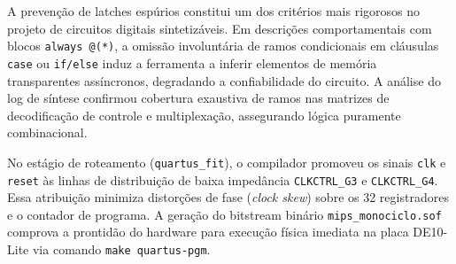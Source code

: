 A prevenção de latches espúrios constitui um dos critérios mais rigorosos no projeto de circuitos digitais sintetizáveis. Em descrições comportamentais com blocos \texttt{always @(*)}, a omissão involuntária de ramos condicionais em cláusulas \texttt{case} ou \texttt{if/else} induz a ferramenta a inferir elementos de memória transparentes assíncronos, degradando a confiabilidade do circuito. A análise do log de síntese confirmou cobertura exaustiva de ramos nas matrizes de decodificação de controle e multiplexação, assegurando lógica puramente combinacional.

No estágio de roteamento (\texttt{quartus\_fit}), o compilador promoveu os sinais \texttt{clk} e \texttt{reset} às linhas de distribuição de baixa impedância \texttt{CLKCTRL\_G3} e \texttt{CLKCTRL\_G4}. Essa atribuição minimiza distorções de fase (\textit{clock skew}) sobre os 32 registradores e o contador de programa. A geração do bitstream binário \texttt{mips\_monociclo.sof} comprova a prontidão do hardware para execução física imediata na placa DE10-Lite via comando \texttt{make quartus-pgm}.
